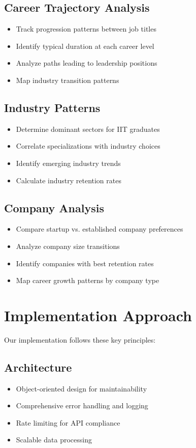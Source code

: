 \documentclass{article}
\begin{document}
\subsection{Career Trajectory Analysis}
\begin{itemize}
    \item Track progression patterns between job titles
    \item Identify typical duration at each career level
    \item Analyze paths leading to leadership positions
    \item Map industry transition patterns
\end{itemize}

\subsection{Industry Patterns}
\begin{itemize}
    \item Determine dominant sectors for IIT graduates
    \item Correlate specializations with industry choices
    \item Identify emerging industry trends
    \item Calculate industry retention rates
\end{itemize}

\subsection{Company Analysis}
\begin{itemize}
    \item Compare startup vs. established company preferences
    \item Analyze company size transitions
    \item Identify companies with best retention rates
    \item Map career growth patterns by company type
\end{itemize}

\section{Implementation Approach}
Our implementation follows these key principles:

\subsection{Architecture}
\begin{itemize}
    \item Object-oriented design for maintainability
    \item Comprehensive error handling and logging
    \item Rate limiting for API compliance
    \item Scalable data processing
\end{itemize}
\end{document}
